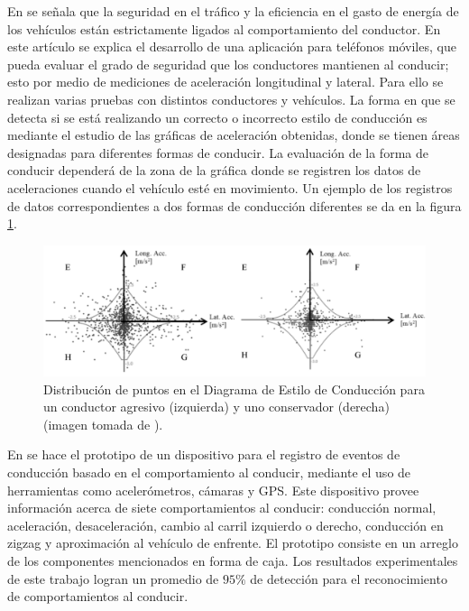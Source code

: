 En \cite{vaiana2014driving} se señala que la seguridad en el tráfico y la eficiencia en el gasto de energía de los vehículos están estrictamente ligados al comportamiento del conductor. 
En este artículo se explica el desarrollo de una aplicación para teléfonos móviles, que pueda evaluar el grado de seguridad que los conductores mantienen al conducir; esto por medio de mediciones de aceleración longitudinal y lateral. 
Para ello se realizan varias pruebas con distintos conductores y vehículos. 
La forma en que se detecta si se está realizando un correcto o incorrecto estilo de conducción es mediante el estudio de las gráficas de aceleración obtenidas, donde se tienen áreas designadas para diferentes formas de conducir. 
La evaluación de la forma de conducir dependerá de la zona de la gráfica donde se registren los datos de aceleraciones cuando el vehículo esté en movimiento. 
Un ejemplo de los registros de datos correspondientes a dos formas de conducción diferentes se da en la figura \ref{10(2)}.

\begin{figure}[H]
\centering
\includegraphics[scale=0.5]{10(2).png}
\caption{Distribución de puntos en el Diagrama de Estilo de Conducción para un conductor agresivo (izquierda) y uno conservador (derecha) (imagen tomada de \cite{vaiana2014driving}).}
\label{10(2)}
\end{figure}

En \cite{wu2013driving} se hace el prototipo de un dispositivo para el registro de eventos de conducción basado en el comportamiento al conducir, mediante el uso de herramientas como acelerómetros, cámaras y GPS.
Este dispositivo provee información acerca de siete comportamientos al conducir: conducción normal, aceleración, desaceleración, cambio al carril izquierdo o derecho, conducción en zigzag y aproximación al vehículo de enfrente.
El prototipo consiste en un arreglo de los componentes mencionados en forma de caja. 
Los resultados experimentales de este trabajo logran un promedio de $95\%$ de detección para el reconocimiento de comportamientos al conducir.

